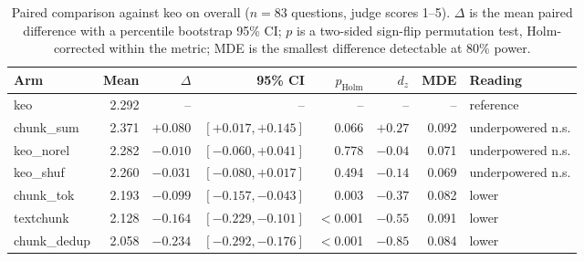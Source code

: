 \begin{table}[t]
\centering
\small
\begin{tabular}{lrrrrrrl}
\toprule
Arm & Mean & $\Delta$ & 95\% CI & $p_{\text{Holm}}$ & $d_z$ & MDE & Reading \\
\midrule
keo & 2.292 & -- & -- & -- & -- & -- & reference \\
\midrule
chunk\_sum & 2.371 & $+0.080$ & $[+0.017, +0.145]$ & 0.066 & $+0.27$ & 0.092 & underpowered n.s. \\
keo\_norel & 2.282 & $-0.010$ & $[-0.060, +0.041]$ & 0.778 & $-0.04$ & 0.071 & underpowered n.s. \\
keo\_shuf & 2.260 & $-0.031$ & $[-0.080, +0.017]$ & 0.494 & $-0.14$ & 0.069 & underpowered n.s. \\
chunk\_tok & 2.193 & $-0.099$ & $[-0.157, -0.043]$ & 0.003 & $-0.37$ & 0.082 & lower \\
textchunk & 2.128 & $-0.164$ & $[-0.229, -0.101]$ & $<$0.001 & $-0.55$ & 0.091 & lower \\
chunk\_dedup & 2.058 & $-0.234$ & $[-0.292, -0.176]$ & $<$0.001 & $-0.85$ & 0.084 & lower \\
\bottomrule
\end{tabular}
\caption{Paired comparison against keo on overall ($n=83$ questions, judge scores 1--5). $\Delta$ is the mean paired difference with a percentile bootstrap 95\% CI; $p$ is a two-sided sign-flip permutation test, Holm-corrected within the metric; MDE is the smallest difference detectable at 80\% power.}
\label{tab:paired-overall}
\end{table}
